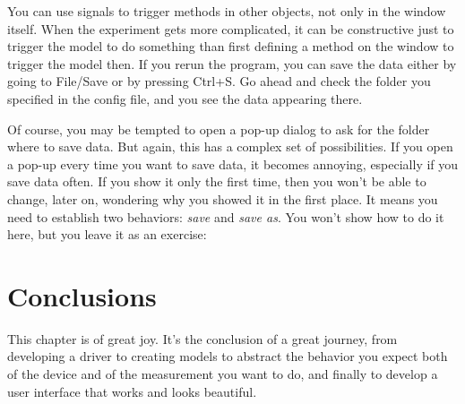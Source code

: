
You can use signals to trigger methods in other objects, not only in the window itself. When the experiment gets more complicated, it can be constructive just to trigger the model to do something than first defining a method on the window to trigger the model then. If you rerun the program, you can save the data either by going to File/Save or by pressing Ctrl+S. Go ahead and check the folder you specified in the config file, and you see the data appearing there.


Of course, you may be tempted to open a pop-up dialog to ask for the folder where to save data. But again, this has a complex set of possibilities. If you open a pop-up every time you want to save data, it becomes annoying, especially if you save data often. If you show it only the first time, then you won't be able to change, later on, wondering why you showed it in the first place. It means you need to establish two behaviors: \emph{save} and \emph{save as}. You won't show how to do it here, but you leave it as an exercise:


\section{Conclusions}\label{sec:conclusions}
This chapter is of great joy. It's the conclusion of a great journey, from developing a driver to creating models to abstract the behavior you expect both of the device and of the measurement you want to do, and finally to develop a user interface that works and looks beautiful.

